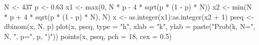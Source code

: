 \begin{Schunk}
\begin{Sinput}
 N <- 437
 p <- 0.63
 x1 <- max(0, N * p - 4 * sqrt(p * (1 - p) * N))
 x2 <- min(N * p + 4 * sqrt(p * (1 - p) * N), N)
 x <- as.integer(x1):as.integer(x2 + 1)
 pseq <- dbinom(x, N, p)
 plot(x, pseq, type = "h", xlab = "k", ylab = paste("Prob(k, N=", N, ", p=", 
      p, ")"))
 points(x, pseq, pch = 18, cex = 0.5)
\end{Sinput}
\end{Schunk}
